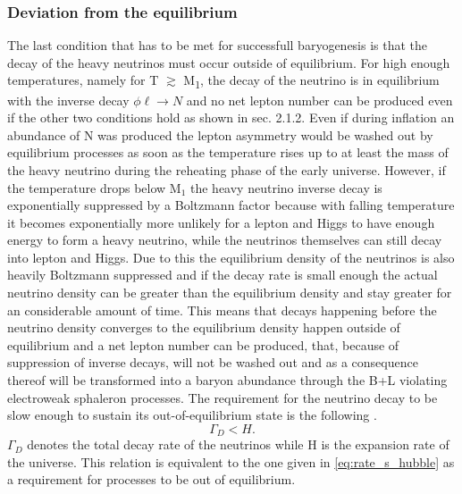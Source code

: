 \subsubsection{Deviation from the equilibrium}
The last condition that has to be met for successfull baryogenesis is that the decay of the heavy neutrinos must occur outside of equilibrium. For high enough temperatures, namely for T $\gtrsim$ M\textsubscript{1}, the decay of the neutrino is in equilibrium with the inverse decay $\phi\ell\rightarrow N$ and no net lepton number can be produced even if the other two conditions hold as shown in sec. 2.1.2. Even if during inflation an abundance of N was produced the lepton asymmetry would be washed out by equilibrium processes as soon as the temperature rises up to at least the mass of the heavy neutrino during the reheating phase of the early universe. \newline\indent
However, if the temperature drops below M$_1$ the heavy neutrino inverse decay is exponentially suppressed by a Boltzmann factor because with falling temperature it becomes exponentially more unlikely for a lepton and Higgs to have enough energy to form a heavy neutrino, while the neutrinos themselves can still decay into lepton and Higgs. Due to this the equilibrium density of the neutrinos is also heavily Boltzmann suppressed and if the decay rate is small enough the actual neutrino density can be greater than the equilibrium density and stay greater for an considerable amount of time. This means that decays happening before the neutrino density converges to the equilibrium density happen outside of equilibrium and a net lepton number can be produced, that, because of suppression of inverse decays, will not be washed out and as a consequence thereof will be transformed into a baryon abundance through the B+L violating electroweak sphaleron processes.\newline\indent
The requirement for the neutrino decay to be slow enough to sustain its out-of-equilibrium state is the following \cite[p. 30]{Taanila:2008}.
\begin{equation}
	\Gamma_D<H.
	\label{eq:out_of_eq}
\end{equation}
$\Gamma_D$ denotes the total decay rate of the neutrinos while H is the expansion rate of the universe. This relation is equivalent to the one given in \eqref{eq:rate_s_hubble} as a requirement for processes to be out of equilibrium. 